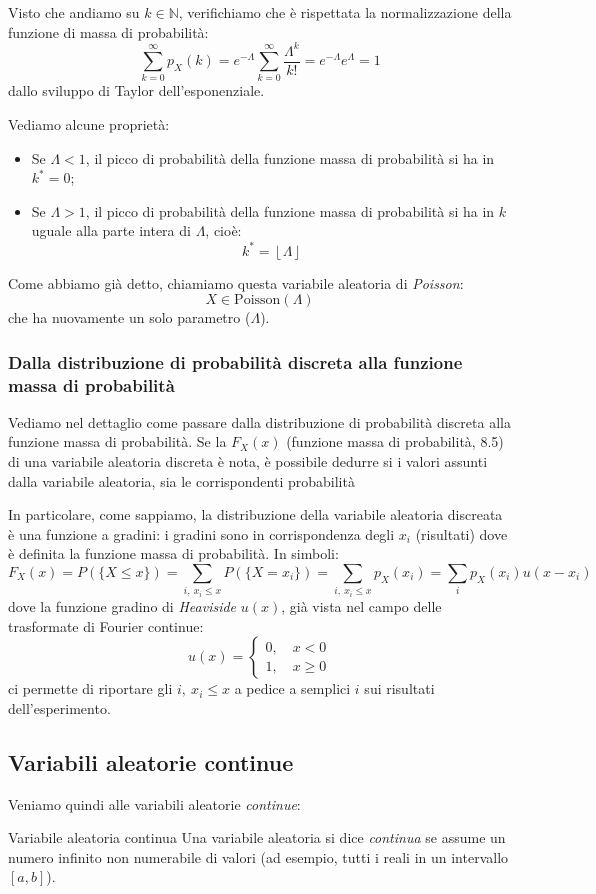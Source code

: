 \documentclass[a4paper,11pt]{article}
\begin{document}
\begin{itemize}
Visto che andiamo su $k \in \mathbb{N}$, verifichiamo che è rispettata la normalizzazione della funzione di massa di probabilità:
$$
\sum_{k=0}^\infty p_X(k) = e^{-\Lambda} \sum_{k=0}^\infty \frac{\Lambda^k}{k!} = e^{-\Lambda}e^\Lambda = 1
$$
dallo sviluppo di Taylor dell'esponenziale.

Vediamo alcune proprietà:
\begin{itemize}
	\item Se $\Lambda < 1$, il picco di probabilità della funzione massa di probabilità si ha in $k^* = 0$;
	\item Se $\Lambda > 1$, il picco di probabilità della funzione massa di probabilità si ha in $k$ uguale alla parte intera di $\Lambda$, cioè:
$$
k^* = \left \lfloor{\Lambda}\right \rfloor 
$$
\end{itemize}

Come abbiamo già detto, chiamiamo questa variabile aleatoria di \textit{Poisson}:
$$
X \in \mathrm{Poisson}(\Lambda)
$$
che ha nuovamente un solo parametro ($\Lambda$).
\end{itemize}

\subsubsection{Dalla distribuzione di probabilità discreta alla funzione massa di probabilità}
Vediamo nel dettaglio come passare dalla distribuzione di probabilità discreta alla funzione massa di probabilità. Se la $F_X(x)$ (funzione massa di probabilità, 8.5) di una variabile aleatoria discreta è nota, è possibile dedurre si i valori assunti dalla variabile aleatoria, sia le corrispondenti probabilità

In particolare, come sappiamo, la distribuzione della variabile aleatoria discreata è una funzione a gradini: i gradini sono in corrispondenza degli $x_i$ (risultati) dove è definita la funzione massa di probabilità. In simboli: 
$$
F_X(x) = P(\{ X \leq x \}) = \sum_{i, \ x_i \leq x} P( \{X = x_i\} ) = \sum_{i, \ x_i \leq x} p_X (x_i) = \sum_i p_X(x_i) u (x - x_i) 
$$
dove la funzione gradino di \textit{Heaviside} $u(x)$, già vista nel campo delle trasformate di Fourier continue:
$$
u(x) = \begin{cases}
	0, \quad x < 0 \\
	1, \quad x \geq 0
\end{cases}
$$
ci permette di riportare gli $i, \ x_i \leq x$ a pedice a semplici $i$ sui risultati dell'esperimento. 

\subsection{Variabili aleatorie continue}
Veniamo quindi alle variabili aleatorie \textit{continue}:
\begin{definition}{Variabile aleatoria continua}
Una variabile aleatoria si dice \textit{continua} se assume un numero infinito non numerabile di valori (ad esempio, tutti i reali in un intervallo $[a ,b]$).
\end{definition}
\end{document}
